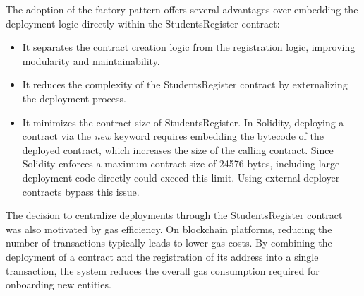 The adoption of the factory pattern offers several advantages over embedding the deployment logic directly within the StudentsRegister contract:
\begin{itemize}
    \item It separates the contract creation logic from the registration logic, improving modularity and maintainability.
    \item It reduces the complexity of the StudentsRegister contract by externalizing the deployment process.
    \item It minimizes the contract size of StudentsRegister. In Solidity, deploying a contract via the \textit{new} keyword requires embedding the bytecode of the deployed contract, which increases the size of the calling contract. Since Solidity enforces a maximum contract size of 24576 bytes, including large deployment code directly could exceed this limit. Using external deployer contracts bypass this issue.
\end{itemize}

The decision to centralize deployments through the StudentsRegister contract was also motivated by gas efficiency. On blockchain platforms, reducing the number of transactions typically leads to lower gas costs. By combining the deployment of a contract and the registration of its address into a single transaction, the system reduces the overall gas consumption required for onboarding new entities.

